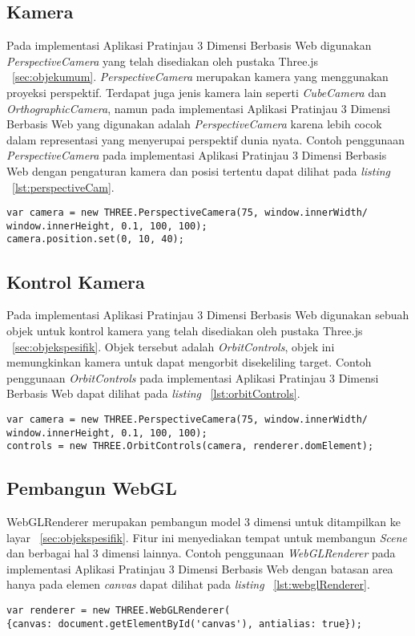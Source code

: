 \subsection{Kamera}
Pada implementasi Aplikasi Pratinjau 3 Dimensi Berbasis Web digunakan {\it PerspectiveCamera} yang telah disediakan oleh pustaka Three.js ~\ref{sec:objekumum}. {\it PerspectiveCamera} merupakan kamera yang menggunakan proyeksi perspektif. Terdapat juga jenis kamera lain seperti {\it CubeCamera} dan {\it OrthographicCamera}, namun pada implementasi Aplikasi Pratinjau 3 Dimensi Berbasis Web yang digunakan adalah {\it PerspectiveCamera} karena lebih cocok dalam representasi yang menyerupai perspektif dunia nyata. Contoh penggunaan {\it PerspectiveCamera} pada implementasi Aplikasi Pratinjau 3 Dimensi Berbasis Web dengan pengaturan kamera dan posisi tertentu dapat dilihat pada {\it listing} ~\ref{lst:perspectiveCam}.
\begin{lstlisting}[caption={Contoh penggunaan {\it PerspectiveCamera}}, label={lst:perspectiveCam},captionpos=b]
var camera = new THREE.PerspectiveCamera(75, window.innerWidth/
window.innerHeight, 0.1, 100, 100);
camera.position.set(0, 10, 40);
\end{lstlisting}

\subsection{Kontrol Kamera}
Pada implementasi Aplikasi Pratinjau 3 Dimensi Berbasis Web digunakan sebuah objek untuk kontrol kamera yang telah disediakan oleh pustaka Three.js ~\ref{sec:objekspesifik}. Objek tersebut adalah {\it OrbitControls}, objek ini memungkinkan kamera untuk dapat mengorbit disekeliling target. Contoh penggunaan {\it OrbitControls} pada implementasi Aplikasi Pratinjau 3 Dimensi Berbasis Web dapat dilihat pada {\it listing} ~\ref{lst:orbitControls}.
\begin{lstlisting}[caption={Contoh penggunaan {\it OrbitControls}}, label={lst:orbitControls},captionpos=b]
var camera = new THREE.PerspectiveCamera(75, window.innerWidth/
window.innerHeight, 0.1, 100, 100);
controls = new THREE.OrbitControls(camera, renderer.domElement);
\end{lstlisting}

\subsection{Pembangun WebGL}
WebGLRenderer merupakan pembangun model 3 dimensi untuk ditampilkan ke layar ~\ref{sec:objekspesifik}. Fitur ini menyediakan tempat untuk membangun {\it Scene} dan berbagai hal 3 dimensi lainnya. Contoh penggunaan {\it WebGLRenderer} pada implementasi Aplikasi Pratinjau 3 Dimensi Berbasis Web dengan batasan area hanya pada elemen {\it canvas} dapat dilihat pada {\it listing} ~\ref{lst:webglRenderer}.
\begin{lstlisting}[caption={Contoh penggunaan {\it WebGLRenderer}}, label={lst:webglRenderer},captionpos=b]
var renderer = new THREE.WebGLRenderer(
{canvas: document.getElementById('canvas'), antialias: true});
\end{lstlisting}
	
